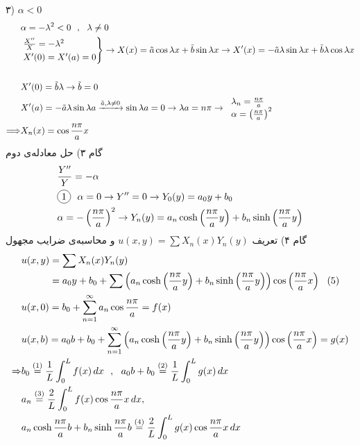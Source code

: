 ۳)
$\alpha<0$
\[\begin{aligned}
	&\alpha=-\lambda^2<0 \ \ , \ \ \lambda\ne0
	\\ &
	\begin{rcases}
		\frac{X^{\prime\prime}}{X}=-\lambda^2
		\\
		X^\prime(0)=X^\prime(a)=0
	\end{rcases}\rightarrow
	X(x)=\tilde{a}\cos{\lambda x}+\tilde{b}\sin{\lambda x}
	\rightarrow X^\prime(x)=-\tilde{a}\lambda\sin{\lambda x}+\tilde{b}\lambda\cos{\lambda x}\\ \\ &
	X^\prime(0)=\tilde{b}\lambda \rightarrow\tilde{b}=0
	\\ &
	X^\prime(a)=-\tilde{a}\lambda\sin{\lambda a}
	\xrightarrow{\tilde{a},\lambda\ne0}
	\sin{\lambda a}=0\rightarrow \lambda a=n\pi \rightarrow \begin{tabular}{l}
		$\lambda_n=\frac{n\pi}{a}$\\
		$\alpha=\pr{\frac{n\pi}{a}}^2$
	\end{tabular}
	\\
	\Longrightarrow &
	X_n(x)=\cos{\frac{n\pi}{a}x}
\end{aligned}\]
گام ۳) حل معادله‌ی دوم
\[\begin{aligned}
	& \frac{Y^{\prime\prime}}{Y}=-\alpha
	\\ &
	\circled1 \ \ \alpha=0\rightarrow Y^{\prime\prime}=0\rightarrow Y_0(y)=a_0y+b_0
	\\ &
	\alpha=-\pr{\frac{n\pi}a}^2\rightarrow Y_n(y)=a_n\cosh\pr{\frac{n\pi}ay}+b_n\sinh\pr{\frac{n\pi}ay}
\end{aligned}\]
گام ۴) تعریف
$u(x,y)=\sum X_n(x)Y_n(y)$
و محاسبه‌ی ضرایب مجهول
\[\begin{aligned}
	&
	\begin{aligned}
		u(x,y)&= \sum X_n(x)Y_n(y)
		\\ &
		=a_0y+b_0+\sum\pr{a_n\cosh\pr{\frac{n\pi}ay}+b_n\sinh\pr{\frac{n\pi}ay}}\cos\pr{\frac{n\pi}ax} \ \ (5)
	\end{aligned}
	\\ &
	u(x,0)=b_0+\sum_{n=1}^\infty a_n\cos\frac{n\pi}a=f(x)
	\\ &
	u(x,b)=a_0b+b_0+\sum_{n=1}^\infty\pr{a_n\cosh\pr{\frac{n\pi}ay}+b_n\sinh\pr{\frac{n\pi}ay}}\cos\pr{\frac{n\pi}ax}=g(x)
	\\ \Rightarrow &
	b_0\stackrel{(1)}{=}\frac1L\int_0^Lf(x)\,dx \ \ , \ \ a_0b+b_0\stackrel{(2)}{=}\frac1L\int_0^Lg(x)\, dx
	\\ &
	a_n\stackrel{(3)}{=}\frac2L\int_0^Lf(x)\cos{\frac{n\pi}ax}\, dx ,
	\\ &
	a_n\cosh{\frac{n\pi}ab}+b_n\sinh{\frac{n\pi}ab}\stackrel{(4)}{=}\frac2L\int_0^Lg(x)\cos{\frac{n\pi}ax}\, dx
\end{aligned}\]
